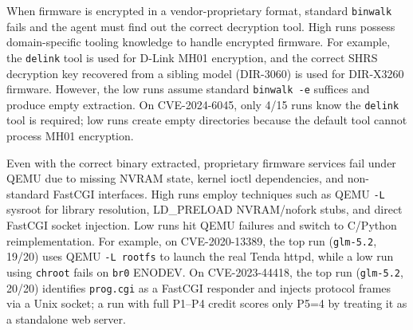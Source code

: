  When firmware is encrypted in a vendor-proprietary format, standard \texttt{binwalk} fails and the agent must find out the correct decryption tool. High runs possess domain-specific tooling knowledge to handle encrypted firmware. For example, the \texttt{delink} tool is used for D-Link MH01 encryption, and the correct SHRS decryption key recovered from a sibling model (DIR-3060) is used for DIR-X3260 firmware. However, the low runs assume standard \texttt{binwalk -e} suffices and produce empty extraction. On CVE-2024-6045, only 4/15 runs know the \texttt{delink} tool is required; low runs create empty directories because the default tool cannot process MH01 encryption.

 Even with the correct binary extracted, proprietary firmware services fail under QEMU due to missing NVRAM state, kernel ioctl dependencies, and non-standard FastCGI interfaces. High runs employ techniques such as QEMU \texttt{-L} sysroot for library resolution, LD\_PRELOAD NVRAM/nofork stubs, and direct FastCGI socket injection. Low runs hit QEMU failures and switch to C/Python reimplementation. For example, on CVE-2020-13389, the top run (\texttt{glm-5.2}, 19/20) uses QEMU \texttt{-L rootfs} to launch the real Tenda httpd, while a low run using \texttt{chroot} fails on \texttt{br0} ENODEV. On CVE-2023-44418, the top run (\texttt{glm-5.2}, 20/20) identifies \texttt{prog.cgi} as a FastCGI responder and injects protocol frames via a Unix socket; a run with full P1--P4 credit scores only P5=4 by treating it as a standalone web server.




